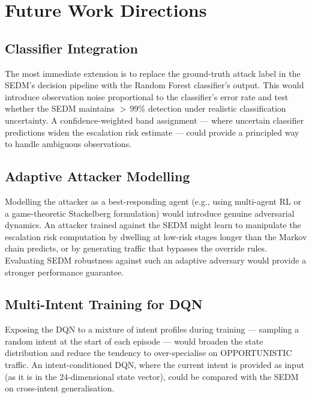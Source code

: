 \section{Future Work Directions}
\label{sec:future}

\subsection{Classifier Integration}
\label{sec:future_classifier}

The most immediate extension is to replace the ground-truth attack label
in the SEDM's decision pipeline with the Random Forest classifier's output.
This would introduce observation noise proportional to the classifier's
error rate and test whether the SEDM maintains $>$\,99\% detection under
realistic classification uncertainty.
A confidence-weighted band assignment --- where uncertain classifier
predictions widen the escalation risk estimate --- could provide a principled
way to handle ambiguous observations.

\subsection{Adaptive Attacker Modelling}

Modelling the attacker as a best-responding agent (e.g., using multi-agent
RL or a game-theoretic Stackelberg formulation) would introduce genuine
adversarial dynamics.
An attacker trained against the SEDM might learn to manipulate the
escalation risk computation by dwelling at low-risk stages longer than
the Markov chain predicts, or by generating traffic that bypasses the
override rules.
Evaluating SEDM robustness against such an adaptive adversary would provide
a stronger performance guarantee.

\subsection{Multi-Intent Training for DQN}

Exposing the DQN to a mixture of intent profiles during training --- sampling
a random intent at the start of each episode --- would broaden the state
distribution and reduce the tendency to over-specialise on OPPORTUNISTIC
traffic.
An intent-conditioned DQN, where the current intent is provided as input
(as it is in the 24-dimensional state vector), could be compared with the
SEDM on cross-intent generalisation.

